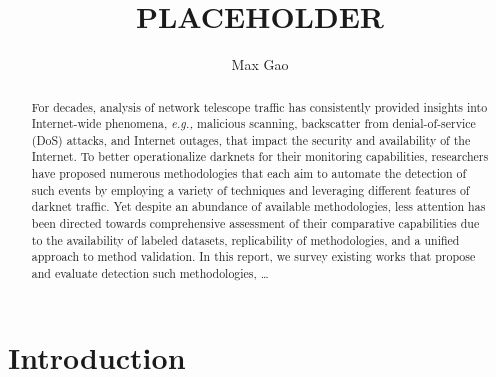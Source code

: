 \documentclass[manuscript,nonacm]{acmart}
\begin{document}
\title{PLACEHOLDER}
\author{Max Gao}

\begin{abstract}
For decades, analysis of network telescope traffic has consistently provided insights into Internet-wide phenomena, \textit{e.g.,} malicious scanning, backscatter from denial-of-service (DoS) attacks, and Internet outages, that impact the security and availability of the Internet.
To better operationalize darknets for their monitoring capabilities, researchers have proposed numerous methodologies that each aim to automate the detection of such events by employing a variety of techniques and leveraging different features of darknet traffic.
Yet despite an abundance of available methodologies, less attention has been directed towards comprehensive assessment of their comparative capabilities due to the availability of labeled datasets, replicability of methodologies, and a unified approach to method validation.
In this report, we survey existing works that propose and evaluate detection such methodologies, \dots

\end{abstract}

\maketitle

\section{Introduction}
\end{document}
